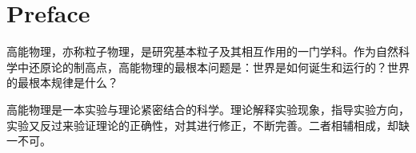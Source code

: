 \chapter{Preface}
高能物理，亦称粒子物理，是研究基本粒子及其相互作用的一门学科。作为自然科学中还原论的制高点，高能物理的最根本问题是：世界是如何诞生和运行的？世界的最根本规律是什么？

高能物理是一本实验与理论紧密结合的科学。理论解释实验现象，指导实验方向，实验又反过来验证理论的正确性，对其进行修正，不断完善。二者相辅相成，却缺一不可。

